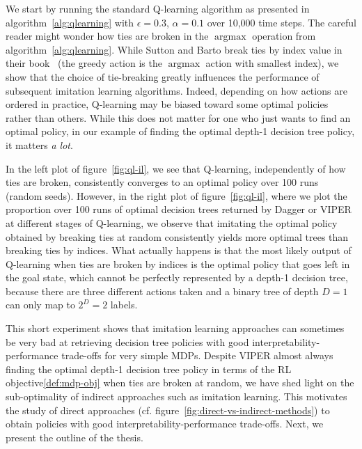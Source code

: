 We start by running the standard Q-learning algorithm as presented in algorithm~\ref{alg:qlearning} with $\epsilon=0.3$, $\alpha=0.1$ over 10,000 time steps.
The careful reader might wonder how ties are broken in the $\operatorname{argmax}$ operation from algorithm~\ref{alg:qlearning}.
While Sutton and Barto break ties by index value in their book~\cite{sutton} (the greedy action is the $\operatorname{argmax}$ action with smallest index), we show that the choice of tie-breaking greatly influences the performance of subsequent imitation learning algorithms.
Indeed, depending on how actions are ordered in practice, Q-learning may be biased toward some optimal policies rather than others.
While this does not matter for one who just wants to find an optimal policy, in our example of finding the optimal depth-1 decision tree policy, it matters \textit{a lot}.

In the left plot of figure~\ref{fig:ql-il}, we see that Q-learning, independently of how ties are broken, consistently converges to an optimal policy over 100 runs (random seeds).
However, in the right plot of figure~\ref{fig:ql-il}, where we plot the proportion over 100 runs of optimal decision trees returned by Dagger or VIPER at different stages of Q-learning, we observe that imitating the optimal policy obtained by breaking ties at random consistently yields more optimal trees than breaking ties by indices.
What actually happens is that the most likely output of Q-learning when ties are broken by indices is the optimal policy that goes left in the goal state,
which cannot be perfectly represented by a depth-1 decision tree, because there are three different actions taken and a binary tree of depth $D=1$ can only map to $2^D=2$ labels.

This short experiment shows that imitation learning approaches can sometimes be very bad at retrieving decision tree policies with good interpretability-performance trade-offs for very simple MDPs. 
Despite VIPER almost always finding the optimal depth-1 decision tree policy in terms of the RL objective\ref{def:mdp-obj} when ties are broken at random, we have shed light on the sub-optimality of indirect approaches such as imitation learning.
This motivates the study of direct approaches (cf. figure~\ref{fig:direct-vs-indirect-methods}) to obtain policies with good interpretability-performance trade-offs.
Next, we present the outline of the thesis.

